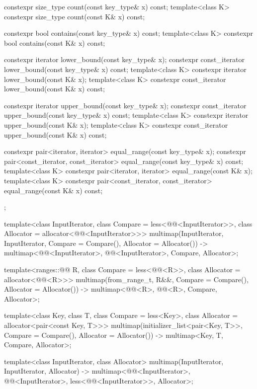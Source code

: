 \begin{codeblock}
{{    constexpr size_type      count(const key_type& x) const;
    template<class K> constexpr size_type count(const K& x) const;

    constexpr bool           contains(const key_type& x) const;
    template<class K> constexpr bool contains(const K& x) const;

    constexpr iterator       lower_bound(const key_type& x);
    constexpr const_iterator lower_bound(const key_type& x) const;
    template<class K> constexpr iterator       lower_bound(const K& x);
    template<class K> constexpr const_iterator lower_bound(const K& x) const;

    constexpr iterator       upper_bound(const key_type& x);
    constexpr const_iterator upper_bound(const key_type& x) const;
    template<class K> constexpr iterator       upper_bound(const K& x);
    template<class K> constexpr const_iterator upper_bound(const K& x) const;

    constexpr pair<iterator, iterator>               equal_range(const key_type& x);
    constexpr pair<const_iterator, const_iterator>   equal_range(const key_type& x) const;
    template<class K>
      constexpr pair<iterator, iterator>             equal_range(const K& x);
    template<class K>
      constexpr pair<const_iterator, const_iterator> equal_range(const K& x) const;
  };

  template<class InputIterator, class Compare = less<@@<InputIterator>>,
           class Allocator = allocator<@@<InputIterator>>>
    multimap(InputIterator, InputIterator, Compare = Compare(), Allocator = Allocator())
      -> multimap<@@<InputIterator>, @@<InputIterator>,
                  Compare, Allocator>;

  template<ranges::@@ R, class Compare = less<@@<R>>,
           class Allocator = allocator<@@<R>>>
    multimap(from_range_t, R&&, Compare = Compare(), Allocator = Allocator())
      -> multimap<@@<R>, @@<R>, Compare, Allocator>;

  template<class Key, class T, class Compare = less<Key>,
           class Allocator = allocator<pair<const Key, T>>>
    multimap(initializer_list<pair<Key, T>>, Compare = Compare(), Allocator = Allocator())
      -> multimap<Key, T, Compare, Allocator>;

  template<class InputIterator, class Allocator>
    multimap(InputIterator, InputIterator, Allocator)
      -> multimap<@@<InputIterator>, @@<InputIterator>,
                  less<@@<InputIterator>>, Allocator>;

}
\end{codeblock}
